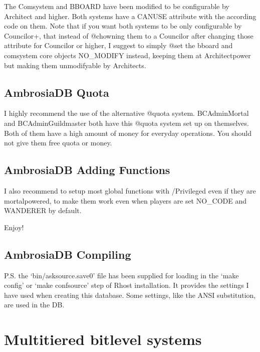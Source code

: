 \documentclass[letterpaper,10pt,english]{sphinxmanual}
\begin{document}
\sphinxAtStartPar
The Comsystem and BBOARD have been modified to be configurable by Architect and
higher. Both systems have a CANUSE attribute with the according code on them.
Note that if you want both systems to be only configurable by Councilor+, that
instead of @chowning them to a Councilor after changing those attribute for
Councilor or higher, I suggest to simply @set the bboard and comsystem core
objects NO\_MODIFY instead, keeping them at Architect\sphinxhyphen{}power but making them
unmodifyable by Architects.


\section{AmbrosiaDB Quota}
\label{\detokenize{ambrosiadb:ambrosiadb-quota}}
\sphinxAtStartPar
I highly recommend the use of the alternative @quota system. BC\sphinxhyphen{}Admin\sphinxhyphen{}Mortal
and BC\sphinxhyphen{}Admin\sphinxhyphen{}Guildmaster both have this @quota system set up on themselves. Both
of them have a high amount of money for everyday operations. You should not give
them free quota or money.


\section{AmbrosiaDB Adding Functions}
\label{\detokenize{ambrosiadb:ambrosiadb-adding-functions}}
\sphinxAtStartPar
I also recommend to setup most global functions with /Privileged even if they
are mortal\sphinxhyphen{}powered, to make them work even when players are set NO\_CODE and
WANDERER by default.

\sphinxAtStartPar
Enjoy!


\section{AmbrosiaDB Compiling}
\label{\detokenize{ambrosiadb:ambrosiadb-compiling}}
\sphinxAtStartPar
P.S. the ‘bin/asksource.save0’ file has been supplied for loading in the
‘make config’ or ‘make confsource’ step of Rhost installation. It provides the
settings I have used when creating this database. Some settings, like the ANSI
substitution, are used in the DB.

\sphinxAtStartPar
{}


\chapter{Multi\sphinxhyphen{}tiered bitlevel systems}
\label{\detokenize{bitlevels:multi-tiered-bitlevel-systems}}\label{\detokenize{bitlevels::doc}}
\end{document}
